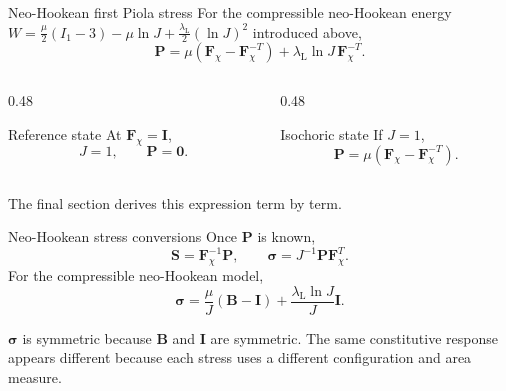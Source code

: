 \documentclass[aspectratio=169,11pt]{beamer}
\newcommand{\I}{\bm{I}}
\newcommand{\Fdef}{\bm{F}_{\chi}}
\newcommand{\Bten}{\bm{B}}
\newcommand{\sigmaC}{\bm{\sigma}}
\newcommand{\Pten}{\bm{P}}
\newcommand{\Sten}{\bm{S}}
\begin{document}
\begin{frame}{Neo-Hookean first Piola stress}
For the compressible neo-Hookean energy \(W=\frac{\mu}{2}(I_1-3)-\mu\ln J+\frac{\lambda_{\mathrm L}}{2}(\ln J)^2\) introduced above,
\[
  \boxed{
  \Pten
  =
  \mu\left(\Fdef-\Fdef^{-T}\right)
  +\lambda_{\mathrm L}\ln J\,\Fdef^{-T}
  }.
\]
\begin{columns}[T,onlytextwidth]
\begin{column}{0.48\textwidth}
\begin{block}{Reference state}
At \(\Fdef=\I\),
\[
  J=1,
  \qquad
  \Pten=\bm{0}.
\]
\end{block}
\end{column}
\begin{column}{0.48\textwidth}
\begin{block}{Isochoric state}
If \(J=1\),
\[
  \Pten
  =
  \mu(\Fdef-\Fdef^{-T}).
\]
\end{block}
\end{column}
\end{columns}
\medskip
\begin{punchbox}
\small
The final section derives this expression term by term.
\end{punchbox}
\end{frame}

\begin{frame}{Neo-Hookean stress conversions}
Once \(\Pten\) is known,
\[
  \Sten=\Fdef^{-1}\Pten,
  \qquad
  \sigmaC=J^{-1}\Pten\Fdef^T.
\]
For the compressible neo-Hookean model,
\[
  \boxed{
  \sigmaC
  =
  \frac{\mu}{J}(\Bten-\I)
  +\frac{\lambda_{\mathrm L}\ln J}{J}\I
  }.
\]
\begin{punchbox}
\small
\(\sigmaC\) is symmetric because \(\Bten\) and \(\I\) are symmetric. The same constitutive response appears different because each stress uses a different configuration and area measure.
\end{punchbox}
\end{frame}
\end{document}
